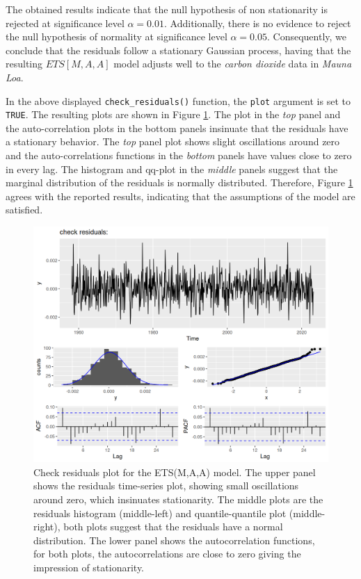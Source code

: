 The obtained results indicate that the null hypothesis of non stationarity is rejected at significance level \(\alpha = 0.01.\) Additionally, there is no evidence to reject the null hypothesis of normality at significance level \(\alpha = 0.05.\) Consequently, we conclude that the residuals follow a stationary Gaussian process, having that the resulting \(ETS[M,A,A]\) model adjusts well to the \emph{carbon dioxide} data in \emph{Mauna Loa}.

In the above displayed \texttt{check\_residuals()} function, the \texttt{plot} argument is set to \texttt{TRUE}. The resulting plots are shown in Figure \ref{fig:fig2-static}. The plot in the \emph{top} panel and the auto-correlation plots in the bottom panels insinuate that the residuals have a stationary behavior. The \emph{top} panel plot shows slight oscillations around zero and the auto-correlations functions in the \emph{bottom} panels have values close to zero in every lag. The histogram and qq-plot in the \emph{middle} panels suggest that the marginal distribution of the residuals is normally distributed. Therefore, Figure \ref{fig:fig2-static} agrees with the reported results, indicating that the assumptions of the model are satisfied.

\begin{figure}

{\centering \includegraphics[width=1\linewidth]{figures/fig2-static-1} 

}

\caption{Check residuals plot for the ETS(M,A,A) model. The upper panel shows the residuals time-series plot, showing small oscillations around zero, which insinuates stationarity. The middle plots are the residuals histogram (middle-left) and quantile-quantile plot (middle-right), both plots suggest that the residuals have a normal distribution. The lower panel shows the autocorrelation functions, for both plots, the autocorrelations are close to zero giving the impression of stationarity.}\label{fig:fig2-static}
\end{figure}



